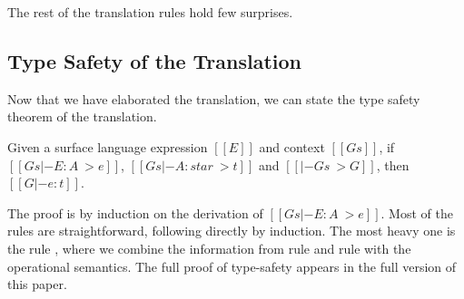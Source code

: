The rest of the translation rules hold few surprises.

\subsection{Type Safety of the Translation}

Now that we have elaborated the translation, we can state the
type safety theorem of the translation.

\begin{theorem}
Given a surface language expression $[[E]]$ and context $[[Gs]]$, 
if $[[Gs |- E:A ~> e]]$, $[[Gs |- A:star ~> t]]$ and $[[|- Gs ~> G]]$, then
$[[G |- e:t]]$.
\end{theorem}

The proof is by induction on the derivation of $[[Gs |- E : A ~> e]]$.
Most of the rules are straightforward, following directly by
induction. The most heavy one is the rule , where we
combine the information from rule  and rule
 with the operational semantics. The full proof of
type-safety appears in the full version of this paper.

